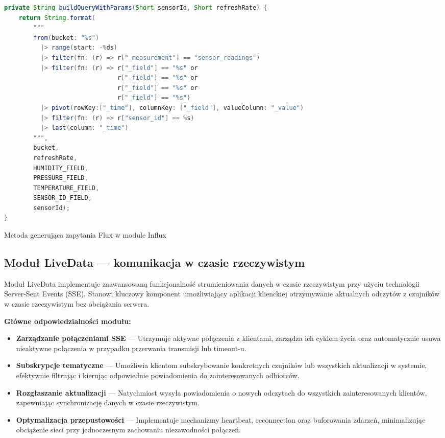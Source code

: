 \documentclass[a4paper,12pt,openany]{book}
\begin{document}
\begin{lstfloat}[H]
\begin{lstlisting}[language=java]
private String buildQueryWithParams(Short sensorId, Short refreshRate) {
    return String.format(
        """
        from(bucket: "%s")
          |> range(start: -%ds)
          |> filter(fn: (r) => r["_measurement"] == "sensor_readings")
          |> filter(fn: (r) => r["_field"] == "%s" or
                               r["_field"] == "%s" or
                               r["_field"] == "%s" or
                               r["_field"] == "%s")
          |> pivot(rowKey:["_time"], columnKey: ["_field"], valueColumn: "_value")
          |> filter(fn: (r) => r["sensor_id"] == %s)
          |> last(column: "_time")
        """,
        bucket,
        refreshRate,
        HUMIDITY_FIELD,
        PRESSURE_FIELD,
        TEMPERATURE_FIELD,
        SENSOR_ID_FIELD,
        sensorId);
}
\end{lstlisting}
\caption{Metoda generująca zapytania Flux w module Influx}
\label{lst:flux-query}
\end{lstfloat}

\subsection{Moduł LiveData --- komunikacja w czasie rzeczywistym}

Moduł LiveData implementuje zaawansowaną funkcjonalność strumieniowania danych w czasie rzeczywistym przy użyciu technologii Server-Sent Events (SSE). Stanowi kluczowy komponent umożliwiający aplikacji klienckiej otrzymywanie aktualnych odczytów z czujników w czasie rzeczywistym bez obciążania serwera.

\textbf{Główne odpowiedzialności modułu:}
\begin{itemize}[itemsep=2pt,topsep=0pt,parsep=0pt]
\vspace{0.5em}
\item \textbf{Zarządzanie połączeniami SSE} --- Utrzymuje aktywne połączenia z klientami, zarządza ich cyklem życia oraz automatycznie usuwa nieaktywne połączenia w przypadku przerwania transmisji lub timeout-u.

\item \textbf{Subskrypcje tematyczne} --- Umożliwia klientom subskrybowanie konkretnych czujników lub wszystkich aktualizacji w systemie, efektywnie filtrując i kierując odpowiednie powiadomienia do zainteresowanych odbiorców.

\item \textbf{Rozgłaszanie aktualizacji} --- Natychmiast wysyła powiadomienia o nowych odczytach do wszystkich zainteresowanych klientów, zapewniając synchronizację danych w czasie rzeczywistym.

\item \textbf{Optymalizacja przepustowości} --- Implementuje mechanizmy heartbeat, reconnection oraz buforowania zdarzeń, minimalizując obciążenie sieci przy jednoczesnym zachowaniu niezawodności połączeń.
\end{itemize}
\end{document}
